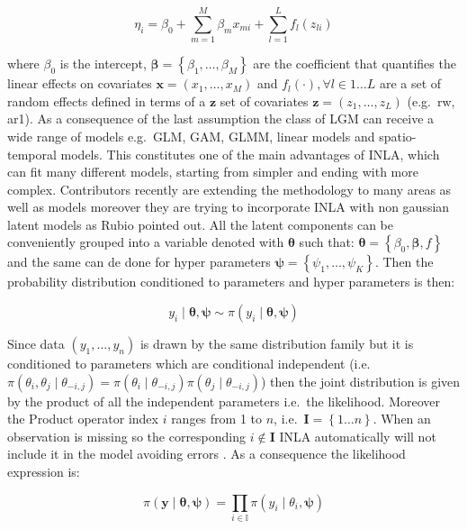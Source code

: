 \documentclass[
  12pt,
  a4paper,
  oneside]{book}
\theoremstyle{definition}
\theoremstyle{definition}
\theoremstyle{definition}
\theoremstyle{remark}
\begin{document}
\[
\eta_{i}=\beta_{0}+\sum_{m=1}^{M} \beta_{m} x_{m i}+\sum_{l=1}^{L} f_{l}\left(z_{l i}\right)
\]

where \(\beta_{0}\) is the intercept, \(\boldsymbol{\beta}=\left\{\beta_{1}, \ldots, \beta_{M}\right\}\) are the coefficient that quantifies the linear effects on covariates \(\boldsymbol{x}=\left({x}_{1}, \ldots, {x}_{M}\right)\) and \(f_{l}(\cdot), \forall l \in 1 \ldots L\) are a set of random effects defined in terms of a \(\boldsymbol{z}\) set of covariates \(\boldsymbol{z}=\left(z_{1}, \ldots, z_{L}\right)\) (e.g.~rw, ar1). As a consequence of the last assumption the class of LGM can receive a wide range of models e.g.~GLM, GAM, GLMM, linear models and spatio-temporal models. This constitutes one of the main advantages of INLA, which can fit many different models, starting from simpler and ending with more complex. Contributors recently are extending the methodology to many areas as well as models moreover they are trying to incorporate INLA with non gaussian latent models as Rubio \citeyearpar{Bayesian_INLA_Rubio} pointed out.
All the latent components can be conveniently grouped into a variable denoted with \(\boldsymbol{\theta}\) such that: \(\boldsymbol{\theta}=\left\{\beta_{0}, \boldsymbol{\beta}, f\right\}\) and the same can de done for hyper parameters \(\boldsymbol{\psi} = \left\{\psi_{1}, \ldots, \psi_{K}\right\}\).
Then the probability distribution conditioned to parameters and hyper parameters is then:

\[
y_{i} \mid \boldsymbol{\theta}, \boldsymbol{\psi} \sim \pi\left(y_{i} \mid \boldsymbol{\theta},\boldsymbol{\psi}\right)
\]

Since data \(\left(y_{1}, \ldots, y_{n}\right)\) is drawn by the same distribution family but it is conditioned to parameters which are conditional independent (i.e.~\(\pi\left(\theta_{i}, \theta_{j} \mid \theta_{-i, j}\right)=\pi\left(\theta_{i} \mid \theta_{-i, j}\right) \pi\left(\theta_{j} \mid \theta_{-i, j}\right)\)) \citep{GMRFRue} then the joint distribution is given by the product of all the independent parameters i.e.~the likelihood. Moreover the Product operator index \(i\) ranges from 1 to \(n\), i.e.~\(\mathbf{I} = \left\{1 \ldots n \right\}\). When an observation is missing so the corresponding \(i \notin \mathbf{I}\) INLA automatically will not include it in the model avoiding errors \citeyearpar{Bayesian_INLA_Rubio}. As a consequence the likelihood expression is:

\begin{equation}
\pi(\boldsymbol{y} \mid \boldsymbol{\theta}, \boldsymbol{\psi})=\prod_{i \in \mathbb{I}} \pi\left(y_{i} \mid \theta_{i}, \boldsymbol{\psi}\right)
\label{eq:likelihood}
\end{equation}
\end{document}
